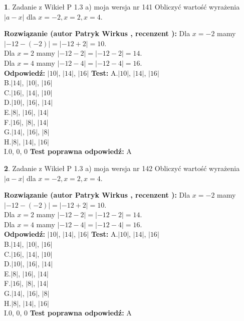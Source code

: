 \documentclass[12pt, a4paper]{article}
\theoremstyle{definition} %
\newtheorem{zad}{}
\newcommand{\zadStart}[1]{\begin{zad}#1\newline}
\newcommand{\zadStop}{\end{zad}}
\newcommand{\rozwStart}[2]{\noindent \textbf{Rozwiązanie (autor #1 , recenzent #2): }\newline}
\newcommand{\rozwStop}{\newline}
\newcommand{\odpStart}{\noindent \textbf{Odpowiedź:}\newline}
\newcommand{\odpStop}{\newline}
\newcommand{\testStart}{\noindent \textbf{Test:}\newline}
\newcommand{\testStop}{\newline}
\newcommand{\kluczStart}{\noindent \textbf{Test poprawna odpowiedź:}\newline}
\newcommand{\kluczStop}{\newline}
\begin{document}
\zadStart{Zadanie z Wikieł P 1.3 a) moja wersja nr 141}
Obliczyć wartość wyrażenia $|a - x|$ dla $x=-2,x=2,x=4$.
\zadStop
\rozwStart{Patryk Wirkus}{}
Dla $x = -2$ mamy $|-12 - (-2)| = |-12 + 2| = 10$.\\
Dla $x = 2$ mamy $|-12 - 2| = |-12 - 2| = 14$.\\
Dla $x = 4$ mamy $|-12 - 4| = |-12 - 4| = 16$.\\
\rozwStop
\odpStart
$|10|$, $|14|$, $|16|$
\odpStop
\testStart
A.$|10|$, $|14|$, $|16|$\\
B.$|14|$, $|10|$, $|16|$\\
C.$|16|$, $|14|$, $|10|$\\
D.$|10|$, $|16|$, $|14|$\\
E.$|8|$, $|16|$, $|14|$\\
F.$|16|$, $|8|$, $|14|$\\
G.$|14|$, $|16|$, $|8|$\\
H.$|8|$, $|14|$, $|16|$\\
I.$0$, $0$, $0$
\testStop
\kluczStart
A
\kluczStop



\zadStart{Zadanie z Wikieł P 1.3 a) moja wersja nr 142}
Obliczyć wartość wyrażenia $|a - x|$ dla $x=-2,x=2,x=4$.
\zadStop
\rozwStart{Patryk Wirkus}{}
Dla $x = -2$ mamy $|-12 - (-2)| = |-12 + 2| = 10$.\\
Dla $x = 2$ mamy $|-12 - 2| = |-12 - 2| = 14$.\\
Dla $x = 4$ mamy $|-12 - 4| = |-12 - 4| = 16$.\\
\rozwStop
\odpStart
$|10|$, $|14|$, $|16|$
\odpStop
\testStart
A.$|10|$, $|14|$, $|16|$\\
B.$|14|$, $|10|$, $|16|$\\
C.$|16|$, $|14|$, $|10|$\\
D.$|10|$, $|16|$, $|14|$\\
E.$|8|$, $|16|$, $|14|$\\
F.$|16|$, $|8|$, $|14|$\\
G.$|14|$, $|16|$, $|8|$\\
H.$|8|$, $|14|$, $|16|$\\
I.$0$, $0$, $0$
\testStop
\kluczStart
A
\kluczStop
\end{document}
